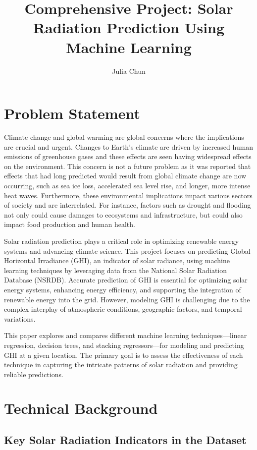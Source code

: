 \documentclass[10pt,twocolumn]{article}
\title{Comprehensive Project: {Solar Radiation Prediction Using Machine Learning}}
\author{Julia Chun}
\affiliation{Occidental College}
\begin{document}
\maketitle

\section{Problem Statement }
Climate change and global warming are global concerns where the implications are crucial and urgent. Changes to Earth's climate are driven by increased human emissions of greenhouse gases and these effects are seen having widespread effects on the environment. This concern is not a future problem as it was reported that effects that had long predicted would result from global climate change are now occurring, such as sea ice loss, accelerated sea level rise, and longer, more intense heat waves\cite{2}. Furthermore, these environmental implications impact various sectors of society and are interrelated. For instance, factors such as drought and flooding not only could cause damages to ecosystems and infrastructure, but could also impact food production and human health\cite{2}.

Solar radiation prediction plays a critical role in optimizing renewable energy systems and advancing climate science. This project focuses on predicting Global Horizontal Irradiance (GHI), an indicator of solar radiance, using machine learning techniques by leveraging data from the National Solar Radiation Database (NSRDB).  Accurate prediction of GHI is essential for optimizing solar energy systems, enhancing energy efficiency, and supporting the integration of renewable energy into the grid. However, modeling GHI is challenging due to the complex interplay of atmospheric conditions, geographic factors, and temporal variations.

This paper explores and compares different machine learning techniques—linear regression, decision trees, and stacking regressors—for modeling and predicting GHI at a given location. The primary goal is to assess the effectiveness of each technique in capturing the intricate patterns of solar radiation and providing reliable predictions.


\section{Technical Background}

\subsection{Key Solar Radiation Indicators in the Dataset}
\end{document}
